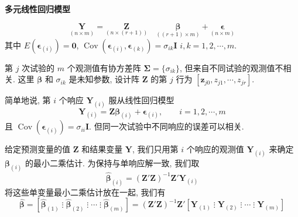\begin{mvbox}
{\centering\textbf{多元线性回归模型}\par}
\label{eq:7-23}
\begin{equation}
\underset{(n\times m)}{\mathbf{Y}}=\underset{(n\times(r+1))}{\mathbf{Z}}\quad\underset{((r+1)\times m)}{\boldsymbol{\beta}}+\underset{(n\times m)}{\boldsymbol{\epsilon}} \tag{7-23}
\end{equation}
其中 $E(\boldsymbol{\epsilon}_{(i)})=\mathbf{0}$, $\operatorname{Cov}(\boldsymbol{\epsilon}_{(i)},\boldsymbol{\epsilon}_{(k)})=\sigma_{ik}\mathbf{I}$ \quad $i,k=1,2,\cdots,m$.

第 $j$ 次试验的 $m$ 个观测值有协方差阵 $\boldsymbol{\Sigma}=\{\sigma_{ik}\}$, 但来自不同试验的观测值不相关. 这里 $\boldsymbol{\beta}$ 和 $\sigma_{ik}$ 是未知参数, 设计阵 $\mathbf{Z}$ 的第 $j$ 行为 $[\mathbf{z}_{j0},z_{j1},\cdots,z_{jr}]$.
\end{mvbox}

简单地说, 第 $i$ 个响应 $\mathbf{Y}_{(i)}$ 服从线性回归模型
\label{eq:7-24}
\begin{equation}
\mathbf{Y}_{(i)}=\mathbf{Z}\boldsymbol{\beta}_{(i)}+\boldsymbol{\epsilon}_{(i)},\qquad i=1,2,\cdots,m \tag{7-24}
\end{equation}
且 $\operatorname{Cov}(\boldsymbol{\epsilon}_{(i)})=\sigma_{ii}\mathbf{I}$. 但同一次试验中不同响应的误差可以相关.

给定预测变量的值 $\mathbf{Z}$ 和结果变量 $\mathbf{Y}$, 我们只用第 $i$ 个响应的观测值 $\mathbf{Y}_{(i)}$ 来确定 $\boldsymbol{\beta}_{(i)}$ 的最小二乘估计. 为保持与单响应解一致, 我们取
\label{eq:7-25}
\begin{equation}
\hat{\boldsymbol{\beta}}_{(i)}=(\mathbf{Z}'\mathbf{Z})^{-1}\mathbf{Z}'\mathbf{Y}_{(i)} \tag{7-25}
\end{equation}
将这些单变量最小二乘估计放在一起, 我们有
\[
\hat{\boldsymbol{\beta}}=\left[\hat{\boldsymbol{\beta}}_{(1)}\;\vdots\;\hat{\boldsymbol{\beta}}_{(2)}\;\vdots\;\cdots\;\vdots\;\hat{\boldsymbol{\beta}}_{(m)}\right]=(\mathbf{Z}'\mathbf{Z})^{-1}\mathbf{Z}'\left[\mathbf{Y}_{(1)}\;\vdots\;\mathbf{Y}_{(2)}\;\vdots\;\cdots\;\vdots\;\mathbf{Y}_{(m)}\right]
\]
